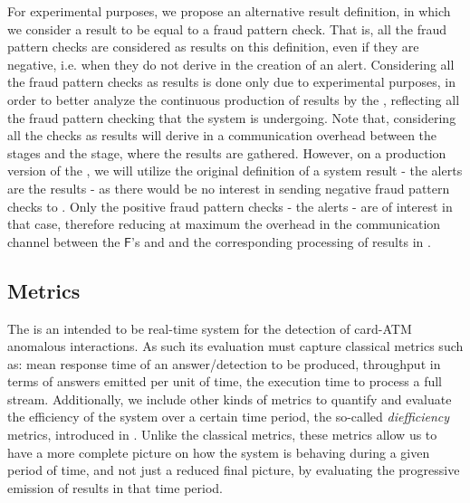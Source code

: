 For experimental purposes, we propose an alternative result definition, in which we consider a result to be equal to a fraud pattern check. That is, all the fraud pattern checks are considered as results on this definition, even if they are negative, i.e. when they do not derive in the creation of an alert. Considering all the fraud pattern checks as results is done only due to experimental purposes, in order to better analyze the continuous production of results by the \DPATM, reflecting all the fraud pattern checking that the system is undergoing. Note that, considering all the checks as results will derive in a communication overhead between the \filter \F stages and the \sink \Sk stage, where the results are gathered. However, on a production version of the \DPATM, we will utilize the original definition of a \DPATM system result - the alerts are the results - as there would be no interest in sending negative fraud pattern checks to \Sk. Only the positive fraud pattern checks - the alerts - are of interest in that case, therefore reducing at maximum the overhead in the communication channel between the $\mathsf{F}$'s and \Sk and the corresponding processing of results in \Sk.

\subsection{Metrics}\label{exps:evaluation-metrics}

The \DPATM is an intended to be real-time system for the detection of card-ATM anomalous interactions. As such its evaluation must capture classical metrics such as: mean response time of an answer/detection to be produced, throughput in terms of answers emitted per unit of time, the execution time to process a full stream. 
Additionally, we include other kinds of metrics to quantify and evaluate the efficiency of the system over a certain time period, the so-called \emph{diefficiency} metrics, introduced in \cite{exps-diefficiency}. Unlike the classical metrics, these metrics allow us to have a more complete picture on how the system is behaving during a given period of time, and not just a reduced final picture, by evaluating the progressive emission of results in that time period.

